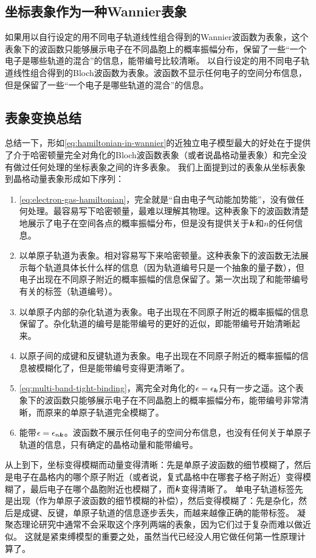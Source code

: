\subsection{坐标表象作为一种Wannier表象} 

如果用以自行设定的用不同电子轨道线性组合得到的Wannier波函数为表象，这个表象下的波函数只能够展示电子在不同晶胞上的概率振幅分布，保留了一些“一个电子是哪些轨道的混合”的信息，能带编号比较清晰。
以自行设定的用不同电子轨道线性组合得到的Bloch波函数为表象。波函数不显示任何电子的空间分布信息，但是保留了一些“一个电子是哪些轨道的混合”的信息。

\subsection{表象变换总结} 

总结一下，形如\eqref{eq:hamiltonian-in-wannier}的近独立电子模型最大的好处在于提供了介于哈密顿量完全对角化的Bloch波函数表象（或者说晶格动量表象）和完全没有做过任何处理的坐标表象之间的许多表象。
我们上面提到过的表象从坐标表象到晶格动量表象形成如下序列：
\begin{enumerate}
    \item \eqref{eq:electron-gas-hamiltonian}，完全就是“自由电子气动能加势能”，没有做任何处理。最容易写下哈密顿量，最难以理解其物理。这种表象下的波函数清楚地展示了电子在空间各点的概率振幅分布，但是没有提供关于$\vb*{k}$和$n$的任何信息。
    \item 以单原子轨道为表象。相对容易写下来哈密顿量。这种表象下的波函数无法展示每个轨道具体长什么样的信息（因为轨道编号只是一个抽象的量子数），但电子出现在不同原子附近的概率振幅的信息保留了。第一次出现了和能带编号有关的标签（轨道编号）。
    \item 以单原子内部的杂化轨道为表象。电子出现在不同原子附近的概率振幅的信息保留了。杂化轨道的编号是能带编号的更好的近似，即能带编号开始清晰起来。
    \item 以原子间的成键和反键轨道为表象。电子出现在不同原子附近的概率振幅的信息被模糊化了，但是能带编号变得更清晰了。
    \item \eqref{eq:multi-band-tight-binding}，离完全对角化的$\epsilon = \epsilon_{\vb*{k}}$只有一步之遥。这个表象下的波函数只能够展示电子在不同晶胞上的概率振幅分布，能带编号非常清晰，而原来的单原子轨道完全模糊了。
    \item 能带$\epsilon = \epsilon_{n\vb*{k}}$。波函数不展示任何电子的空间分布信息，也没有任何关于单原子轨道的信息，只有确定的晶格动量和能带编号。
\end{enumerate}

从上到下，坐标变得模糊而动量变得清晰：先是单原子波函数的细节模糊了，然后是电子在晶格内的哪个原子附近（或者说，复式晶格中在哪套子格子附近）变得模糊了，最后电子在哪个晶胞附近也模糊了，而$\vb*{k}$变得清晰了。
单电子轨道标签先是出现（作为单原子波函数的细节模糊的补偿），然后变得模糊了：先是杂化，然后是成键、反键，单原子轨道的信息逐步丢失，而越来越像正确的能带标签。
凝聚态理论研究中通常不会采取这个序列两端的表象，因为它们过于复杂而难以做近似。
这就是紧束缚模型的重要之处，虽然当代已经没人用它做任何第一性原理计算了。

